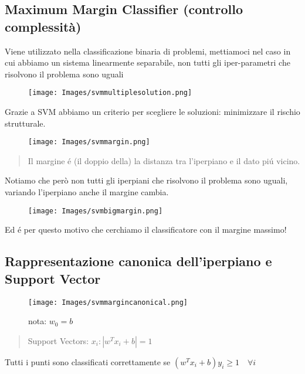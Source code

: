 \documentclass{article}
\begin{document}
\subsection{Maximum Margin Classifier (controllo complessità)}
Viene utilizzato nella classificazione binaria di problemi, mettiamoci nel caso in cui abbiamo un sistema linearmente separabile, non tutti gli iper-parametri che risolvono il problema sono uguali
\begin{figure}[H]
\centering
\texttt{[image: Images/svmmultiplesolution.png]}
\end{figure}
Grazie a SVM abbiamo un criterio per scegliere le soluzioni: minimizzare il rischio strutturale.
\begin{figure}[H]
\centering
\texttt{[image: Images/svmmargin.png]}
\end{figure}
\begin{quote}
    Il margine é (il doppio della) la distanza tra l'iperpiano e il dato piú vicino.
\end{quote}
Notiamo che però non tutti gli iperpiani che risolvono il problema sono uguali, variando l'iperpiano anche il margine cambia.
\begin{figure}[H]
\centering
\texttt{[image: Images/svmbigmargin.png]}
\end{figure}
Ed é per questo motivo che cerchiamo il classificatore con il margine massimo!

\subsection{Rappresentazione canonica dell'iperpiano e Support Vector}
\begin{figure}[H]
\centering
\texttt{[image: Images/svmmargincanonical.png]}
\caption{nota: $w_0=b$}
\end{figure}
\begin{quote}
    Support Vectors: $x_i : |w^Tx_i+b|=1$
\end{quote}
Tutti i punti sono classificati correttamente se $(w^Tx_i+b)y_i \geq 1 \quad \forall i$
\clearpage
\end{document}
